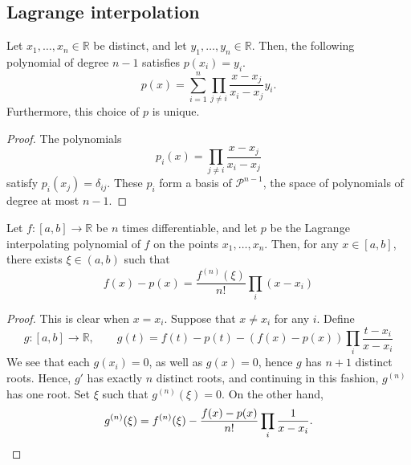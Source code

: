 \documentclass[11pt]{article}
\newcommand{\R}{\mathbb{R}}
\theoremstyle{definition}
\theoremstyle{remark}
\numberwithin{equation}{section}
\begin{document}
    \subsection{Lagrange interpolation}
    \begin{theorem}
        Let $x_1, \dots, x_n \in \R$ be distinct, and let $y_1, \dots, y_n \in \R$.
        Then, the following polynomial of degree $n - 1$ satisfies $p(x_i) = y_i$. \[
            p(x) = \sum_{i = 1}^{n} \prod_{j \neq i} \frac{x - x_j}{x_i - x_j} y_i.
        \] Furthermore, this choice of $p$ is unique.
    \end{theorem}
    \begin{proof}
        The polynomials \[
            p_i(x) = \prod_{j \neq i} \frac{x - x_j}{x_i - x_j}
        \] satisfy $p_i(x_j) = \delta_{ij}$. These $p_i$ form a basis of
        $\mathscr{P}^{n - 1}$, the space of polynomials of degree at most $n - 1$.
    \end{proof}

    \begin{theorem}
        Let $f\colon [a, b] \to \R$ be $n$ times differentiable, and let $p$ be the
        Lagrange interpolating polynomial of $f$ on the points $x_1, \dots, x_n$.
        Then, for any $x \in [a, b]$, there exists $\xi \in (a, b)$ such that \[
            f(x) - p(x) = \frac{f^{(n)}(\xi)}{n!} \prod_{i} (x - x_i)
        \] 
    \end{theorem}
    \begin{proof}
        This is clear when $x = x_i$. Suppose that $x \neq x_i$ for any $i$.  Define
        \[
            g\colon [a, b] \to \R, \qquad g(t) = f(t) - p(t) - (f(x) - p(x))
            \prod_{i} \frac{t - x_i}{x - x_i}
        \] We see that each $g(x_i) = 0$, as well as $g(x) = 0$, hence $g$ has $n +
        1$ distinct roots. Hence, $g'$ has exactly $n$ distinct roots, and continuing
        in this fashion, $g^{(n)}$ has one root. Set $\xi$ such that $g^{(n)}(\xi) =
        0$. On the other hand, \[
            g^{(n)}(\xi) = f^{(n)}(\xi) - \frac{f(x) - p(x)}{n!}\prod_i \frac{1}{x
            - x_i}. \qedhere
        \] 
    \end{proof}
    
\end{document}
